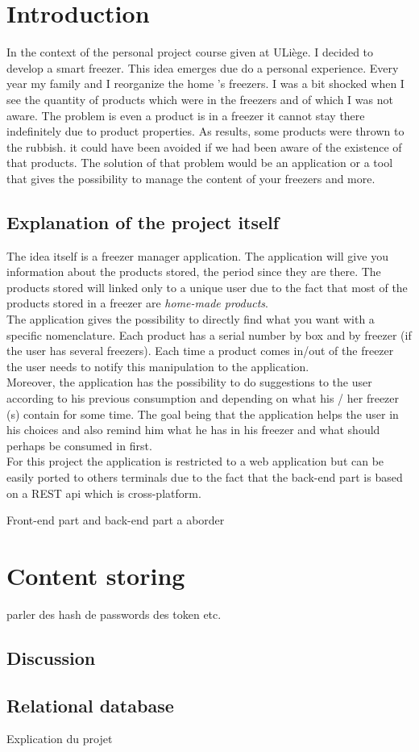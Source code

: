\section{Introduction}
In the context of the personal project course given at ULiège. I decided to develop a smart freezer. This idea emerges due do a personal experience. Every year my family and I reorganize the home 's freezers. I was a bit shocked when I see the quantity of products which were in the freezers and of which I was not aware. The problem is even a product is in a freezer it cannot stay there indefinitely due to product properties. As results, some products were thrown to the rubbish. it could have been avoided if we had been aware of the existence of that products. The solution of that problem would be an application or a tool that gives the possibility to manage the content of your freezers and more.

\subsection{Explanation of the project itself}
The idea itself is a freezer manager application. The application will give you information about the products stored, the period since they are there. The products stored will linked only to a unique user due to the fact that most of the products stored in a freezer are \textit{home-made products}.\\
The application gives the possibility to directly find what you want with a specific nomenclature. Each product has a serial number by box and by freezer (if the user has several freezers). Each time a product comes in/out of the freezer the user needs to notify this manipulation to the application.\\
Moreover, the application has the possibility to do suggestions to the user according to his previous consumption and depending on what his / her freezer (s) contain for some time. The goal being that the application helps the user in his choices and also remind him what he has in his freezer and what should perhaps be consumed in first. \\

For this project the application is restricted to a web application but can be easily ported to others terminals due to the fact that the back-end part is based on a REST api which is cross-platform.

Front-end part and back-end part a aborder
\section{Content storing}
parler des hash de passwords des token etc.
\subsection{Discussion}
\subsection{Relational database}

Explication du projet


